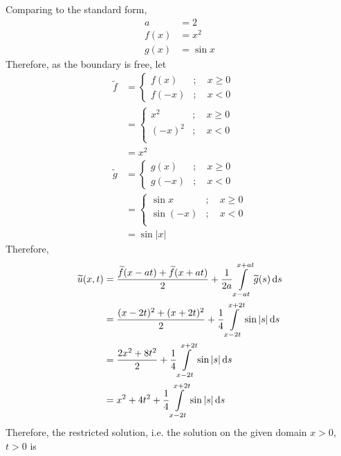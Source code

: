 \documentclass[titlepage, fleqn, a4paper, 12pt, twoside]{article}
\theoremstyle{definition}
\theoremstyle{theorem}
\renewcommand{\tilde}{\widetilde}
\begin{document}
\begin{solution}
	Comparing to the standard form,
	\begin{align*}
		a    & = 2   \\
		f(x) & = x^2 \\
		g(x) & = \sin x
	\end{align*}
	Therefore, as the boundary is free, let
	\begin{align*}
		\tilde{f} &=
			\begin{cases}
				f(x)  & ;\quad x \ge 0 \\
				f(-x) & ;\quad x < 0
			\end{cases}\\
		&=
			\begin{cases}
				x^2    & ;\quad x \ge 0 \\
				(-x)^2 & ;\quad x < 0   \\
			\end{cases}\\
		&= x^2\\
		\tilde{g} &=
			\begin{cases}
				g(x)  & ;\quad x \ge 0 \\
				g(-x) & ;\quad x < 0
			\end{cases}\\
		&=
			\begin{cases}
				\sin x   & ;\quad x \ge 0 \\
				\sin(-x) & ;\quad x < 0   \\
			\end{cases}\\
		&= \sin|x|
	\end{align*}
	Therefore,
	\begin{align*}
		\tilde{u}(x,t) & = \frac{\tilde{f}(x - a t) + \tilde{f}(x + a t)}{2} + \frac{1}{2 a} \int\limits_{x - a t}^{x + a t} \tilde{g}(s) \dif s \\
                               & = \frac{(x - 2 t)^2 + (x + 2 t)^2}{2} + \frac{1}{4} \int\limits_{x - 2 t}^{x + 2 t} \sin|s| \dif s                      \\
                               & = \frac{2 x^2 + 8 t^2}{2} +  \frac{1}{4} \int\limits_{x - 2 t}^{x + 2 t} \sin|s| \dif s                                 \\
                               & = x^2 + 4 t^2 + \frac{1}{4} \int\limits_{x - 2 t}^{x + 2 t} \sin|s| \dif s
	\end{align*}
	Therefore, the restricted solution, i.e. the solution on the given domain $x > 0$, $t > 0$ is
	\begin{align*}

\end{align*}
\end{solution}
\end{document}
